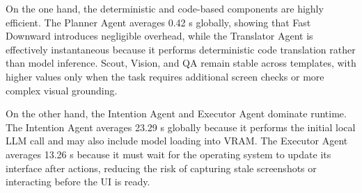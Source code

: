 \begin{table}[H]
\centering
{}
\caption{Autopilot average Agent times (seconds) per task template averaged across 3 runs each.}
\label{tab:agent_timings}
\end{table}

On the one hand, the deterministic and code-based components are highly efficient. The Planner Agent averages 0.42 s globally, showing that Fast Downward introduces negligible overhead, while the Translator Agent is effectively instantaneous because it performs deterministic code translation rather than model inference. Scout, Vision, and QA remain stable across templates, with higher values only when the task requires additional screen checks or more complex visual grounding.

On the other hand, the Intention Agent and Executor Agent dominate runtime. The Intention Agent averages 23.29 s globally because it performs the initial local LLM call and may also include model loading into VRAM. The Executor Agent averages 13.26 s because it must wait for the operating system to update its interface after actions, reducing the risk of capturing stale screenshots or interacting before the UI is ready.


